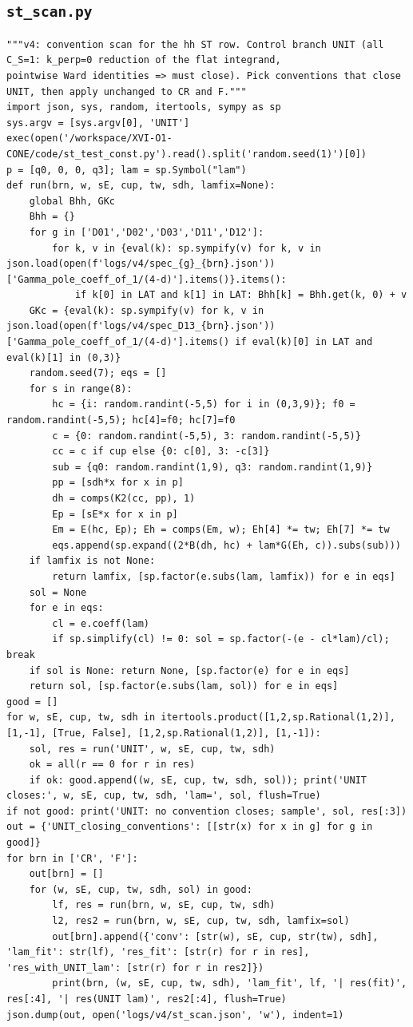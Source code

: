 \documentclass[10pt]{article}
\begin{document}
\subsection{\texttt{st\_scan.py}}
\begin{lstlisting}
"""v4: convention scan for the hh ST row. Control branch UNIT (all C_S=1: k_perp=0 reduction of the flat integrand,
pointwise Ward identities => must close). Pick conventions that close UNIT, then apply unchanged to CR and F."""
import json, sys, random, itertools, sympy as sp
sys.argv = [sys.argv[0], 'UNIT']
exec(open('/workspace/XVI-O1-CONE/code/st_test_const.py').read().split('random.seed(1)')[0])
p = [q0, 0, 0, q3]; lam = sp.Symbol("lam")
def run(brn, w, sE, cup, tw, sdh, lamfix=None):
    global Bhh, GKc
    Bhh = {}
    for g in ['D01','D02','D03','D11','D12']:
        for k, v in {eval(k): sp.sympify(v) for k, v in json.load(open(f'logs/v4/spec_{g}_{brn}.json'))['Gamma_pole_coeff_of_1/(4-d)'].items()}.items():
            if k[0] in LAT and k[1] in LAT: Bhh[k] = Bhh.get(k, 0) + v
    GKc = {eval(k): sp.sympify(v) for k, v in json.load(open(f'logs/v4/spec_D13_{brn}.json'))['Gamma_pole_coeff_of_1/(4-d)'].items() if eval(k)[0] in LAT and eval(k)[1] in (0,3)}
    random.seed(7); eqs = []
    for s in range(8):
        hc = {i: random.randint(-5,5) for i in (0,3,9)}; f0 = random.randint(-5,5); hc[4]=f0; hc[7]=f0
        c = {0: random.randint(-5,5), 3: random.randint(-5,5)}
        cc = c if cup else {0: c[0], 3: -c[3]}
        sub = {q0: random.randint(1,9), q3: random.randint(1,9)}
        pp = [sdh*x for x in p]
        dh = comps(K2(cc, pp), 1)
        Ep = [sE*x for x in p]
        Em = E(hc, Ep); Eh = comps(Em, w); Eh[4] *= tw; Eh[7] *= tw
        eqs.append(sp.expand((2*B(dh, hc) + lam*G(Eh, c)).subs(sub)))
    if lamfix is not None:
        return lamfix, [sp.factor(e.subs(lam, lamfix)) for e in eqs]
    sol = None
    for e in eqs:
        cl = e.coeff(lam)
        if sp.simplify(cl) != 0: sol = sp.factor(-(e - cl*lam)/cl); break
    if sol is None: return None, [sp.factor(e) for e in eqs]
    return sol, [sp.factor(e.subs(lam, sol)) for e in eqs]
good = []
for w, sE, cup, tw, sdh in itertools.product([1,2,sp.Rational(1,2)], [1,-1], [True, False], [1,2,sp.Rational(1,2)], [1,-1]):
    sol, res = run('UNIT', w, sE, cup, tw, sdh)
    ok = all(r == 0 for r in res)
    if ok: good.append((w, sE, cup, tw, sdh, sol)); print('UNIT closes:', w, sE, cup, tw, sdh, 'lam=', sol, flush=True)
if not good: print('UNIT: no convention closes; sample', sol, res[:3])
out = {'UNIT_closing_conventions': [[str(x) for x in g] for g in good]}
for brn in ['CR', 'F']:
    out[brn] = []
    for (w, sE, cup, tw, sdh, sol) in good:
        lf, res = run(brn, w, sE, cup, tw, sdh)
        l2, res2 = run(brn, w, sE, cup, tw, sdh, lamfix=sol)
        out[brn].append({'conv': [str(w), sE, cup, str(tw), sdh], 'lam_fit': str(lf), 'res_fit': [str(r) for r in res], 'res_with_UNIT_lam': [str(r) for r in res2]})
        print(brn, (w, sE, cup, tw, sdh), 'lam_fit', lf, '| res(fit)', res[:4], '| res(UNIT lam)', res2[:4], flush=True)
json.dump(out, open('logs/v4/st_scan.json', 'w'), indent=1)
\end{lstlisting}
\end{document}
